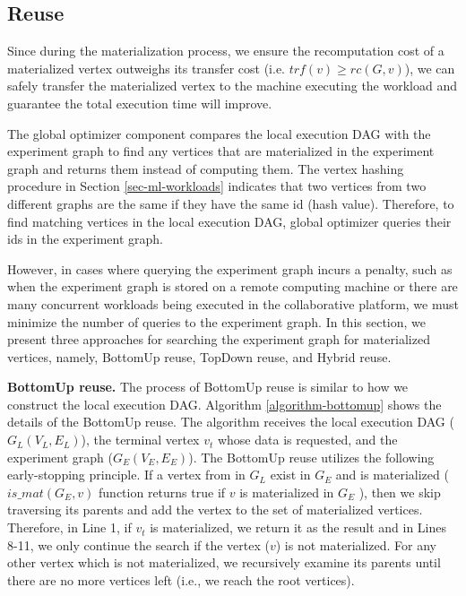 \subsection{Reuse}
Since during the materialization process, we ensure the recomputation cost of a materialized vertex outweighs its transfer cost (i.e. $trf(v) \geq rc(G,v)$), we can safely transfer the materialized vertex to the machine executing the workload and guarantee the total execution time will improve.

The global optimizer component compares the local execution DAG with the experiment graph to find any vertices that are materialized in the experiment graph and returns them instead of computing them.
The vertex hashing procedure in Section \ref{sec-ml-workloads} indicates that two vertices from two different graphs are the same if they have the same id (hash value).
Therefore, to find matching vertices in the local execution DAG, global optimizer queries their ids in the experiment graph.

However, in cases where querying the experiment graph incurs a penalty, such as when the experiment graph is stored on a remote computing machine or there are many concurrent workloads being executed in the collaborative platform, we must minimize the number of queries to the experiment graph.
In this section, we present three approaches for searching the experiment graph for materialized vertices, namely, BottomUp reuse, TopDown reuse, and Hybrid reuse.

\textbf{BottomUp reuse.}
The process of BottomUp reuse is similar to how we construct the local execution DAG.
Algorithm \ref{algorithm-bottomup} shows the details of the BottomUp reuse.
The algorithm receives the local execution DAG ($G_L(V_L, E_L)$), the terminal vertex $v_t$ whose data is requested, and the experiment graph ($G_E(V_E, E_E)$).
The BottomUp reuse utilizes the following early-stopping principle. 
If a vertex from in $G_L$ exist in $G_E$ and is materialized ($is\_mat(G_E, v)$ function returns true if $v$ is materialized in $G_E$ ), then we skip traversing its parents and add the vertex to the set of materialized vertices.
Therefore, in Line 1, if $v_t$ is materialized, we return it as the result and in Lines 8-11, we only continue the search if the vertex ($v$) is not materialized.
For any other vertex which is not materialized, we recursively examine its parents until there are no more vertices left (i.e., we reach the root vertices).

